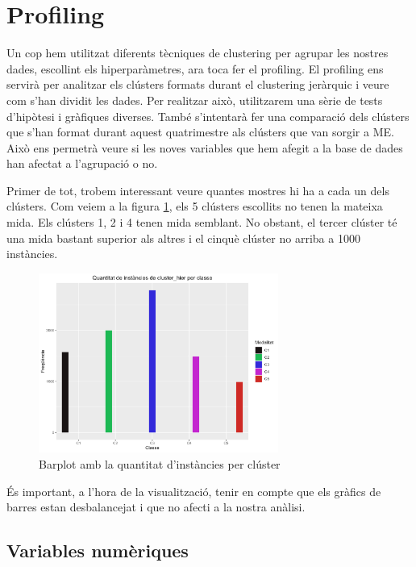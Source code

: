 \newpage
\section{Profiling}

Un cop hem utilitzat diferents tècniques de clustering per agrupar les nostres dades, escollint els hiperparàmetres, ara toca fer el profiling. El profiling ens servirà per analitzar els clústers formats durant el clustering jeràrquic i veure com s'han dividit les dades. Per realitzar això, utilitzarem una sèrie de tests d'hipòtesi i gràfiques diverses. També s'intentarà fer una comparació dels clústers que s'han format durant aquest quatrimestre als clústers que van sorgir a ME. Això ens permetrà veure si les noves variables que hem afegit a la base de dades han afectat a l'agrupació o no. 

Primer de tot, trobem interessant veure quantes mostres hi ha a cada un dels clústers. Com veiem a la figura \ref{fig:Cat_BarPlot_cluster_hier}, els 5 clústers escollits no tenen la mateixa mida. Els clústers 1, 2 i 4 tenen mida semblant. No obstant, el tercer clúster té una mida bastant superior als altres i el cinquè clúster no arriba a 1000 instàncies.

\begin{figure}[H] 
    \centering
    \includegraphics[width=0.7\textwidth]{Images/5_Profiling/categoriques/cat/Cat_BarPlot_cluster_hier.png}
    \caption{Barplot amb la quantitat d'instàncies per clúster}
    \label{fig:Cat_BarPlot_cluster_hier}
\end{figure}

És important, a l'hora de la visualització, tenir en compte que els gràfics de barres estan desbalancejat i que no afecti a la nostra anàlisi. 

\subsection{Variables numèriques}

